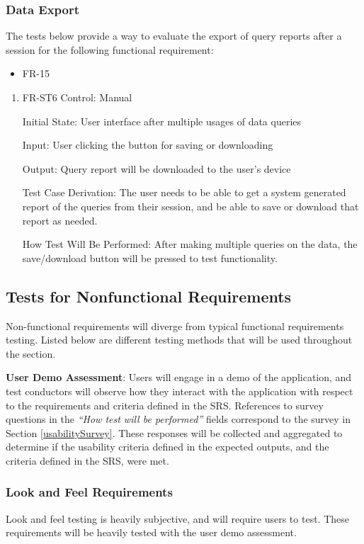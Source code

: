 \documentclass[12pt, titlepage]{article}
\begin{document}
  \subsubsection{Data Export}
  The tests below provide a way to evaluate the export of query reports after a
  session for the following functional requirement:
  \begin{itemize}
    \item FR-15
  \end{itemize}
  \begin{enumerate}
    \item{FR-ST6}
    Control: Manual

    Initial State: User interface after multiple usages of data queries

    Input: User clicking the button for saving or downloading

    Output: Query report will be downloaded to the user's device

    Test Case Derivation: The user needs to be able to get a system generated
    report of the queries from their session, and be able to save or download
    that report as needed.

    How Test Will Be Performed: After making multiple queries on the data, the
    save/download button will be pressed to test functionality.
  \end{enumerate}


\subsection{Tests for Nonfunctional Requirements}
Non-functional requirements will diverge from typical functional requirements
testing. Listed below are different testing methods that will be used throughout
the section.

\noindent \textbf{User Demo Assessment}: Users will engage in a demo of the
application, and test conductors will observe how they interact with the
application with respect to the requirements and criteria defined in the SRS.
References to survey questions in the \emph{``How test will be performed''} fields
correspond to the survey in Section \ref{usabilitySurvey}. These responses will
be collected and aggregated to determine if the usability criteria defined in
the expected outputs, and the criteria defined in the SRS, were met.


\subsubsection{Look and Feel Requirements}
Look and feel testing is heavily subjective, and will require users to test.
These requirements will be heavily tested with the user demo assessment.
\end{document}
